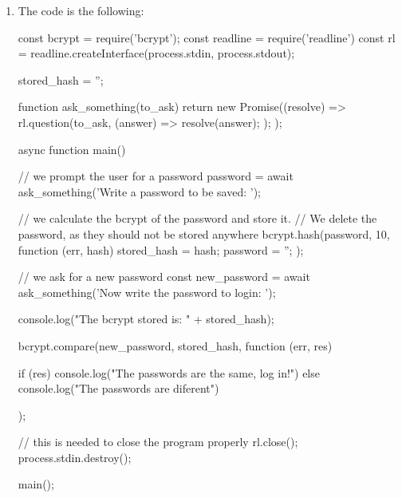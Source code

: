\begin{Answer}[ref={basic-js-crypto-bcrypt}]
\begin{enumerate}[1.]
\item The code is the following: 

\begin{js}
const bcrypt = require('bcrypt');
const readline = require('readline')
const rl = readline.createInterface(process.stdin, process.stdout);

stored_hash = '';

function ask_something(to_ask) {
    return new Promise((resolve) => {
        rl.question(to_ask, (answer) => {
            resolve(answer);
        });
    });
}

async function main() {
    
    // we prompt the user for a password
    password = await ask_something('Write a password to be saved: ');

    // we calculate the bcrypt of the password and store it.
    // We delete the password, as they should not be stored anywhere
    bcrypt.hash(password, 10, function (err, hash) {
        stored_hash = hash;
        password = '';
    });
    
    // we ask for a new password
    const new_password = await ask_something('Now write the password to login: ');

    console.log("The bcrypt stored is: " + stored_hash);

    bcrypt.compare(new_password, stored_hash, function (err, res) {

        if (res) {
            console.log("The passwords are the same, log in!")
        } else {
            console.log("The passwords are diferent")
        }
    });
  
    // this is needed to close the program properly
    rl.close();
    process.stdin.destroy();
}

main();
\end{js}
\end{enumerate}
\end{Answer}
